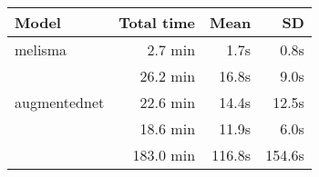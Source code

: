 \begin{tabular}{l|rrr}
    Model                        & Total time & Mean    & SD     \\ \hline
    \gls{melisma}                & 2.7 min    & 1.7s    & 0.8s   \\
    \textcite{chen2021attend}    & 26.2 min   & 16.8s   & 9.0s   \\
    \gls{augmentednet}           & 22.6 min   & 14.4s   & 12.5s  \\
    \textcite{micchi2021deep}    & 18.6 min   & 11.9s   & 6.0s  \\
    \textcite{mcleod2021modular} & 183.0 min  & 116.8s  & 154.6s \\
\end{tabular}
